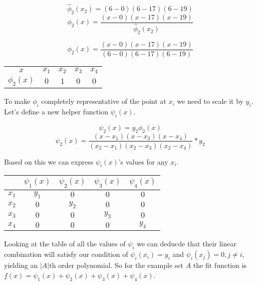 \documentclass[12pt, titlepage]{article}
\begin{document}
\begin{equation}
    \hat{\phi}_2(x_2) = (6 - 0)(6 - 17)(6 - 19)
\end{equation}
\begin{equation}
    \phi_2(x) = \frac{(x - 0)(x - 17)(x - 19)}{\hat{\phi}_2(x_2)}
\end{equation}

\begin{equation}
    \phi_2(x) = \frac{(x - 0)(x - 17)(x - 19)}{(6 - 0)(6 - 17)(6 - 19)}
\end{equation}

{
\centering
\begin{tabular}{c|c c c c}
    $x$ & $x_1$ & $x_2$ & $x_3$ & $x_4$ \\
    $\phi_2(x)$ & $0$ & $1$ & $0$ & $0$ \\
\end{tabular}\par
}

To make $\phi_i$ completely representative of the point at $x_i$ we need to 
scale it by $y_i$. Let's define a new helper function $\psi_i(x)$.

\begin{equation}
    \psi_2(x) = y_2 \phi_2(x)
\end{equation}
\begin{equation}
    \psi_2(x) = \frac{(x - x_1)(x - x_3)(x - x_4)}{(x_2 - x_1)(x_2 - x_3)(x_2 - x_4)} * y_2
\end{equation}

Based on this we can express $\psi_i(x)$'s values for any $x_i$.

{
\centering
\begin{tabular}{c|c c c c}
    & $\psi_1(x) $ & $\psi_2(x)$ & $\psi_3(x)$ & $\psi_4(x)$ \\
    \hline
    $x_1$ & $y_1$ & $0$ & $0$ & $0$ \\
    $x_2$ & $0$ & $y_2$ & $0$ & $0$ \\
    $x_3$ & $0$ & $0$ & $y_3$ & $0$ \\
    $x_4$ & $0$ & $0$ & $0$ & $y_4$ \\
\end{tabular}\par
}

Looking at the table of all the values of $\psi_i$ we can deducde that their linear
combination will satisfy our condition of $\psi_i(x_i) = y_i$ and 
$\psi_i(x_j) = 0, j \neq i$, yielding an $|A|$th order polynomial. 
So for the example set $A$ the fit function is 
$f(x) = \psi_1(x) + \psi_2(x) + \psi_3(x) + \psi_4(x)$.
\end{document}
